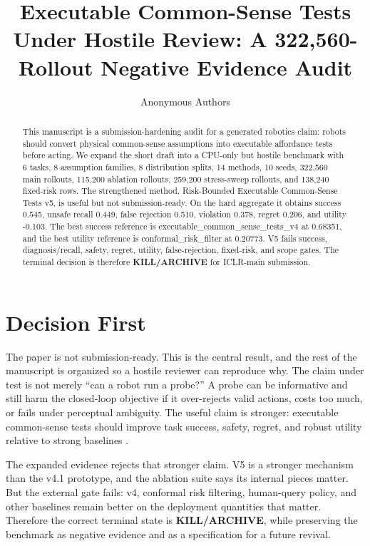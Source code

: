 \documentclass{article}
\title{Executable Common-Sense Tests Under Hostile Review: A 322,560-Rollout Negative Evidence Audit}
\author{Anonymous Authors}
\newcommand{\methodname}{Risk-Bounded Executable Common-Sense Tests}
\newcommand{\terminalname}{KILL/ARCHIVE}
\begin{document}
\maketitle

\begin{abstract}
This manuscript is a submission-hardening audit for a generated robotics claim: robots should convert physical common-sense assumptions into executable affordance tests before acting. We expand the short draft into a CPU-only but hostile benchmark with 6 tasks, 8 assumption families, 8 distribution splits, 14 methods, 10 seeds, 322,560 main rollouts, 115,200 ablation rollouts, 259,200 stress-sweep rollouts, and 138,240 fixed-risk rows. The strengthened method, \methodname{} v5, is useful but not submission-ready. On the hard aggregate it obtains success 0.545, unsafe recall 0.449, false rejection 0.510, violation 0.378, regret 0.206, and utility -0.103. The best success reference is executable\_common\_sense\_tests\_v4 at 0.68351, and the best utility reference is conformal\_risk\_filter at 0.20773. V5 fails success, diagnosis/recall, safety, regret, utility, false-rejection, fixed-risk, and scope gates. The terminal decision is therefore \textbf{\terminalname} for ICLR-main submission.
\end{abstract}

\section{Decision First}
The paper is not submission-ready. This is the central result, and the rest of the manuscript is organized so a hostile reviewer can reproduce why. The claim under test is not merely ``can a robot run a probe?'' A probe can be informative and still harm the closed-loop objective if it over-rejects valid actions, costs too much, or fails under perceptual ambiguity. The useful claim is stronger: executable common-sense tests should improve task success, safety, regret, and robust utility relative to strong baselines \citep{r1070777siv2i415315,r101109lra20253604702,r101007978981978171315,r101016jimavis201410010,r10117702783649231212929,r10117702783649211056967,r101016jartint201607002,r101109lra20192933815}.

The expanded evidence rejects that stronger claim. V5 is a stronger mechanism than the v4.1 prototype, and the ablation suite says its internal pieces matter. But the external gate fails: v4, conformal risk filtering, human-query policy, and other baselines remain better on the deployment quantities that matter. Therefore the correct terminal state is \textbf{\terminalname}, while preserving the benchmark as negative evidence and as a specification for a future revival.
\end{document}
